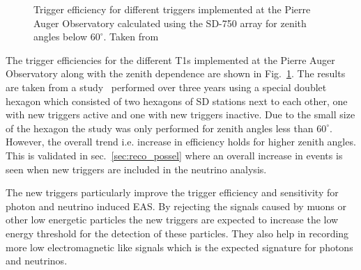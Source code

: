 \begin{figure}[t!]
  \centering
  \hfill
  \caption{Trigger efficiency for different triggers implemented at the Pierre Auger Observatory calculated using the SD-750 array for zenith angles below $60^{\circ}$. Taken from~\cite{gap_note_2017}}
  \label{fig:Trigger_eff_infill}
\end{figure}

The trigger efficiencies for the different T1s implemented at the Pierre Auger Observatory along with the zenith dependence are shown in Fig.~\ref{fig:Trigger_eff_infill}. The results are taken from a study~\cite{gap_note_2017} performed over three years using a special doublet hexagon which consisted of two hexagons of SD stations next to each other, one with new triggers active and one with new triggers inactive. Due to the small size of the hexagon the study was only performed for zenith angles less than $60^{\circ}$. However, the overall trend i.e. increase in efficiency holds for higher zenith angles. This is validated in sec.~\ref{sec:reco_possel} where an overall increase in events is seen when new triggers are included in the neutrino analysis.

The new triggers particularly improve the trigger efficiency and sensitivity for photon and neutrino induced EAS. By rejecting the signals caused by muons or other low energetic particles the new triggers are expected to increase the low energy threshold for the detection of these particles. They also help in recording more low electromagnetic like signals which is the expected signature for photons and neutrinos. 

